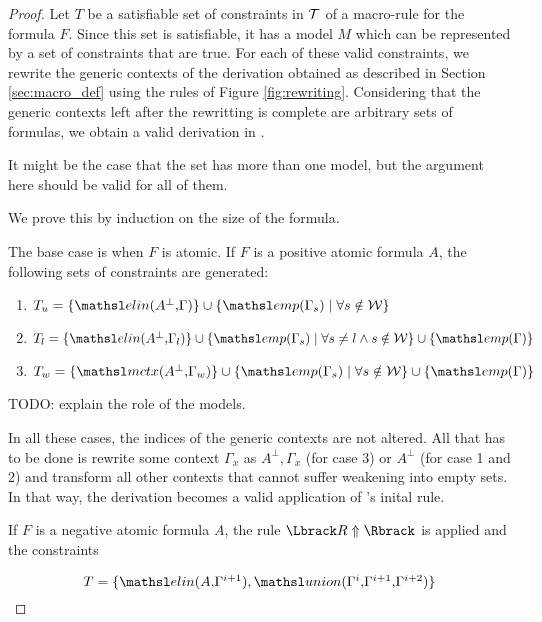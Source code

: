 \begin{proof}
Let $T$ be a satisfiable set of constraints in $\mathcal{T}$ of a macro-rule for the 
formula $F$. Since this set is satisfiable, it has a model $M$ which can be
represented by a set of constraints that are true. For each of these valid
constraints, we rewrite the generic contexts of the derivation obtained as
described in Section \ref{sec:macro_def} using the rules of
Figure \ref{fig:rewriting}. Considering that the generic contexts left after
the rewritting is complete are arbitrary sets of formulas, we obtain a valid 
derivation in \sellf.

\begin{giselle}
It might be the
case that the set has more than one model, but the argument here should be valid for
all of them.
\end{giselle}

We prove this by induction on the size of the formula. 

The base case is when $F$ is atomic. If $F$ is a positive atomic formula $A$, the
following sets of constraints are generated:

\begin{enumerate}
  \item $T_u = \{\elin{A^{\bot}}{\Gamma}\} \cup \{ \emp{\Gamma_s} \mid \forall s
        \notin \Wscr\} $
  \item $T_l = \{\elin{A^{\bot}}{\Gamma_l} \} \cup \{ \emp{\Gamma_s} \mid \forall s
        \neq l \wedge s \notin \Wscr \} \cup \{ \emp{\Gamma} \}$
  \item $T_w = \{\mctx{A^{\bot}}{\Gamma_w} \} \cup \{ \emp{\Gamma_s} \mid \forall s
        \notin \Wscr \} \cup \{ \emp{\Gamma} \}$
\end{enumerate}

\begin{giselle}
TODO: explain the role of the models.
\end{giselle}

In all these cases, the indices of the generic contexts are not altered. All
that has to be done is rewrite some context $\Gamma_x$ as $A^{\bot}, \Gamma_x$
(for case 3) or $A^{\bot}$ (for case 1 and 2) and transform all other contexts
that cannot suffer weakening into empty sets. In that way, the derivation
becomes a valid application of \sellf's inital rule.

If $F$ is a negative atomic formula $A$, the rule $\alg{R\Uparrow}$ is applied and the
constraints 

$$T = \{ \elin{A}{\Gamma^{i+1}}, \union{\Gamma^i}{\Gamma^{i+1}}{\Gamma^{i+2}} \}$$


\end{proof}
